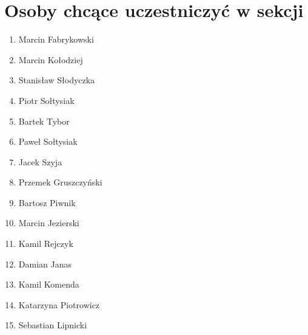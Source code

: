 \documentclass[a4paper,12pt]{article}
\begin{document}
\section{Osoby chcące uczestniczyć w sekcji}
\begin{enumerate}
\item Marcin Fabrykowski
\item Marcin Kołodziej
\item Stanisław Słodyczka
\item Piotr Sołtysiak
\item Bartek Tybor
\item Paweł Sołtysiak
\item Jacek Szyja
\item Przemek Gruszczyński
\item Bartosz Piwnik
\item Marcin Jezierski
\item Kamil Rejczyk
\item Damian Janas
\item Kamil Komenda
\item Katarzyna Piotrowicz
\item Sebastian Lipnicki
\end{enumerate}
\end{document}
